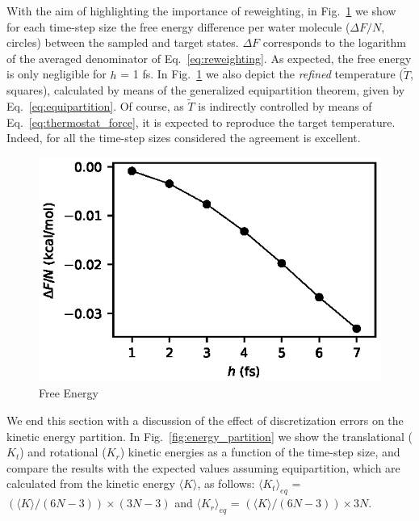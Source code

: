 \documentclass[
journal=jctcce,
layout=twocolumn
]{achemso}
\newcommand{\refined}[1]{\widetilde{#1}}
\begin{document}
With the aim of highlighting the importance of reweighting, in Fig.~\ref{fig:free_energy} we show for each time-step size the free energy difference per water molecule ($\Delta F/N$, circles) between the sampled and target states.
$\Delta F$ corresponds to the logarithm of the averaged denominator of Eq.~\ref{eq:reweighting}.
As expected, the free energy is only negligible for $h$ = 1 fs.
In Fig.~\ref{fig:free_energy} we also depict the \textit{refined} temperature ($\refined{T}$, squares), calculated by means of the generalized equipartition theorem, given by Eq.~\ref{eq:equipartition}.
Of course, as $\refined{T}$ is indirectly controlled by means of Eq.~\ref{eq:thermostat_force}, it is expected to reproduce the target temperature.
Indeed, for all the time-step sizes considered the agreement is excellent.

\begin{figure}
	\includegraphics{Figures/Free_Energy.eps}
	\caption{Free Energy}
	\label{fig:free_energy}
\end{figure}

We end this section with a discussion of the effect of discretization errors on the kinetic energy partition.
In Fig.~\ref{fig:energy_partition} we show the translational ($K_t$) and rotational ($K_r$) kinetic energies as a function of the time-step size, and compare the results with the expected values assuming equipartition, which are calculated from the kinetic energy $\langle K \rangle$, as follows: $\langle K_t \rangle_{eq}$ = $(\langle K \rangle /(6N -3)) \times (3N - 3)$ and $\langle K_r \rangle_{eq}$ = $(\langle K \rangle /(6N -3)) \times 3N$.
\end{document}
